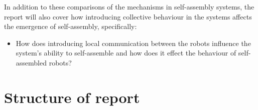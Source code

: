 In addition to these comparisons of the mechanisms in self-assembly systems, the report will also cover how introducing collective behaviour in the systems affects the emergence of self-assembly, specifically:

\begin{itemize}

\item How does introducing local communication between the robots influence the system's ability to self-assemble and how does it effect the behaviour of self-assembled robots?

\end{itemize}

\section{Structure of report}

